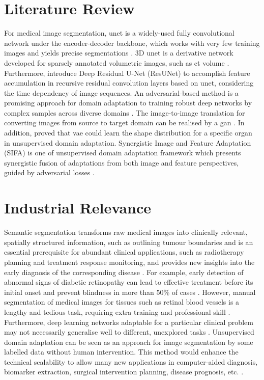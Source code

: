 \documentclass[11pt,times,oneside,openright]{eeereport}
\begin{document}
\section{Literature Review}
For medical image segmentation, \acrfull{unet} is a widely-used fully convolutional network under the encoder-decoder backbone, which works with very few training images and yields precise segmentations \cite{ronneberger2015u}. 3D \acrshort{unet} is a derivative network developed for sparsely annotated volumetric images, such as \acrshort{ct} volume \cite{cciccek20163d}. Furthermore, \citet{zhang2018road} introduce Deep Residual U-Net (ResUNet) to accomplish feature accumulation in recursive residual convolution layers based on \acrshort{unet}, considering the time dependency of image sequences. An adversarial-based method is a promising approach for domain adaptation to training robust deep networks by complex samples across diverse domains \cite{tzeng2017adversarial}. The image-to-image translation for converting images from source to target domain can be realised by a \acrfull{gan} \cite{goodfellow2020generative}. In addition, \citet{liu2019alarm} proved that \acrfull{vae} could learn the shape distribution for a specific organ in unsupervised domain adaptation. Synergistic Image and Feature Adaptation (SIFA) is one of unsupervised domain adaptation framework which presents synergistic fusion of adaptations from both image and feature perspectives, guided by adversarial losses \cite{chen2019synergistic}.

\section{Industrial Relevance}
Semantic segmentation transforms raw medical images into clinically relevant, spatially structured information, such as outlining tumour boundaries and is an essential prerequisite for abundant clinical applications, such as radiotherapy planning and treatment response monitoring, and provides new insights into the early diagnosis of the corresponding disease \cite{antonelli2021medical}. For example, early detection of abnormal signs of diabetic retinopathy can lead to effective treatment before its initial onset and prevent blindness in more than 50\% of cases \cite{jin2006multifocal}. However, manual segmentation of medical images for tissues such as retinal blood vessels is a lengthy and tedious task, requiring extra training and professional skill \cite{asad2014ant}. Furthermore, deep learning networks adaptable for a particular clinical problem may not necessarily generalise well to different, unexplored tasks \cite{antonelli2021medical}. Unsupervised domain adaptation can be seen as an approach for image segmentation by some labelled data without human intervention. This method would enhance the technical scalability to allow many new applications in computer-aided diagnosis, biomarker extraction, surgical intervention planning, disease prognosis, etc. \cite{antonelli2021medical}.
\end{document}
